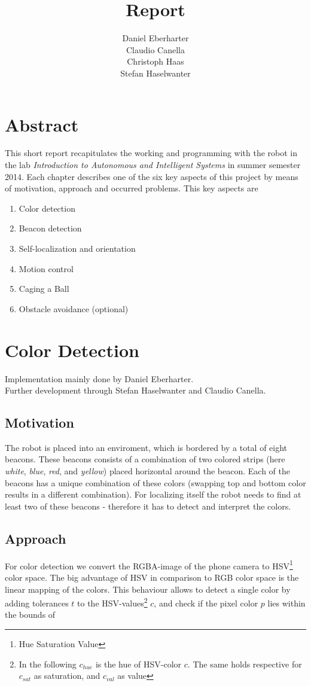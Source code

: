 \documentclass[703031]{iisreport}
\title{\textbf{Report}}
\author{Daniel Eberharter\\ Claudio Canella\\ Christoph Haas\\ Stefan Haselwanter}
\begin{document}
\maketitle

\section{Abstract}
This short report recapitulates the working and programming with the robot in the lab \emph{Introduction to Autonomous and Intelligent Systems} in summer semester 2014. Each chapter describes one of the six key aspects of this project by means of motivation, approach and occurred problems. This key aspects are
\begin{enumerate}
	\item Color detection
	\item Beacon detection
	\item Self-localization and orientation
	\item Motion control
	\item Caging a Ball
	\item Obstacle avoidance (optional)
\end{enumerate}

\section{Color Detection}
Implementation mainly done by Daniel Eberharter.\\
Further development through Stefan Haselwanter and Claudio Canella.

\subsection{Motivation}
The robot is placed into an enviroment, which is bordered by a total of eight beacons. These beacons consists of a combination of two colored strips (here \emph{white}, \emph{blue}, \emph{red}, and \emph{yellow}) placed horizontal around the beacon. Each of the beacons has a unique combination of these colors (swapping top and bottom color results in a different combination).
For localizing itself the robot needs to find at least two of these beacons - therefore it has to detect and interpret the colors.

\subsection{Approach}
For color detection we convert the RGBA-image of the phone camera to HSV\footnote{Hue Saturation Value} color space. The big advantage of HSV in comparison to RGB color space is the linear mapping of the colors. This behaviour allows to detect a single color by adding tolerances $t$ to the HSV-values\footnote{In the following $c_{hue}$ is the hue of HSV-color $c$. The same holds respective for $c_{sat}$ as saturation, and $c_{val}$ as value} $c$, and check if the pixel color $p$ lies within the bounds of 
\end{document}

